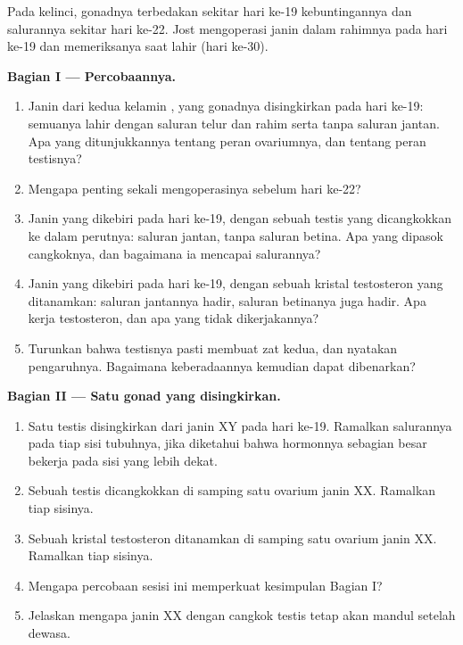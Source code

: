 \begin{problem}
\label{pb:g11:becoming-male-female:1}
Pada kelinci, gonadnya terbedakan sekitar hari ke-19 kebuntingannya dan
salurannya sekitar hari ke-22. Jost mengoperasi janin dalam rahimnya
pada hari ke-19 dan memeriksanya saat lahir (hari ke-30).

\medskip
\noindent\textbf{Bagian I --- Percobaannya.}
\begin{enumerate}
  \item Janin dari kedua kelamin , yang gonadnya
        disingkirkan pada hari ke-19: semuanya lahir dengan saluran
        telur dan rahim serta tanpa saluran jantan. Apa yang
        ditunjukkannya tentang peran ovariumnya, dan tentang peran testisnya?
  \item Mengapa penting sekali mengoperasinya sebelum hari ke-22?
  \item Janin yang dikebiri pada hari ke-19, dengan sebuah testis yang
        dicangkokkan ke dalam perutnya: saluran jantan, tanpa saluran
        betina. Apa yang dipasok cangkoknya, dan bagaimana ia mencapai
        salurannya?
  \item Janin yang dikebiri pada hari ke-19, dengan sebuah kristal
        testosteron yang ditanamkan: saluran jantannya hadir, saluran
        betinanya juga hadir. Apa kerja testosteron, dan apa yang tidak
        dikerjakannya?
  \item Turunkan bahwa testisnya pasti membuat zat kedua, dan nyatakan
        pengaruhnya. Bagaimana keberadaannya kemudian dapat dibenarkan?
\end{enumerate}

\medskip
\noindent\textbf{Bagian II --- Satu gonad yang disingkirkan.}
\begin{enumerate}[resume]
  \item Satu testis disingkirkan dari janin XY pada hari ke-19.
        Ramalkan salurannya pada tiap sisi tubuhnya, jika diketahui
        bahwa hormonnya sebagian besar bekerja pada sisi yang lebih dekat.
  \item Sebuah testis dicangkokkan di samping satu ovarium janin XX.
        Ramalkan tiap sisinya.
  \item Sebuah kristal testosteron ditanamkan di samping satu ovarium
        janin XX. Ramalkan tiap sisinya.
  \item Mengapa percobaan sesisi ini memperkuat kesimpulan Bagian I?
  \item Jelaskan mengapa janin XX dengan cangkok testis tetap akan
        mandul setelah dewasa.
\end{enumerate}


\end{problem}
